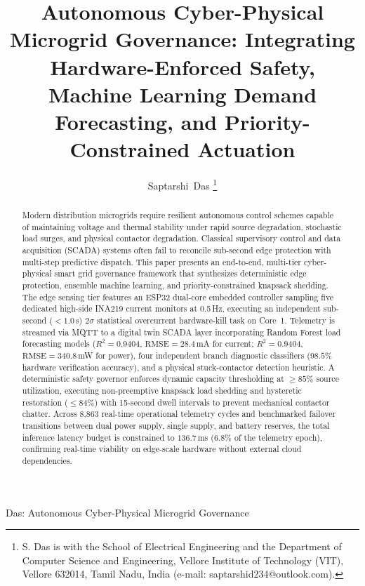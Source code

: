 \documentclass[journal,10pt,twocolumn]{IEEEtran}
\begin{document}
\title{Autonomous Cyber-Physical Microgrid Governance: Integrating Hardware-Enforced Safety, Machine Learning Demand Forecasting, and Priority-Constrained Actuation}

\author{Saptarshi~Das%
\thanks{S. Das is with the School of Electrical Engineering and the Department of Computer Science and Engineering, Vellore Institute of Technology (VIT), Vellore 632014, Tamil Nadu, India (e-mail: saptarshid234@outlook.com).}
}

%
{Das: Autonomous Cyber-Physical Microgrid Governance}

\maketitle

\begin{abstract}
Modern distribution microgrids require resilient autonomous control schemes capable of maintaining voltage and thermal stability under rapid source degradation, stochastic load surges, and physical contactor degradation. Classical supervisory control and data acquisition (SCADA) systems often fail to reconcile sub-second edge protection with multi-step predictive dispatch. This paper presents an end-to-end, multi-tier cyber-physical smart grid governance framework that synthesizes deterministic edge protection, ensemble machine learning, and priority-constrained knapsack shedding. The edge sensing tier features an ESP32 dual-core embedded controller sampling five dedicated high-side INA219 current monitors at 0.5\,Hz, executing an independent sub-second ($<1.0$\,s) $2\sigma$ statistical overcurrent hardware-kill task on Core~1. Telemetry is streamed via MQTT to a digital twin SCADA layer incorporating Random Forest load forecasting models ($R^2 = 0.9404$, $\text{RMSE} = 28.4$\,mA for current; $R^2 = 0.9404$, $\text{RMSE} = 340.8$\,mW for power), four independent branch diagnostic classifiers ($98.5\%$ hardware verification accuracy), and a physical stuck-contactor detection heuristic. A deterministic safety governor enforces dynamic capacity thresholding at $\ge 85\%$ source utilization, executing non-preemptive knapsack load shedding and hysteretic restoration ($\le 84\%$) with 15-second dwell intervals to prevent mechanical contactor chatter. Across 8,863 real-time operational telemetry cycles and benchmarked failover transitions between dual power supply, single supply, and battery reserves, the total inference latency budget is constrained to $136.7$\,ms ($6.8\%$ of the telemetry epoch), confirming real-time viability on edge-scale hardware without external cloud dependencies.
\end{abstract}
\end{document}
